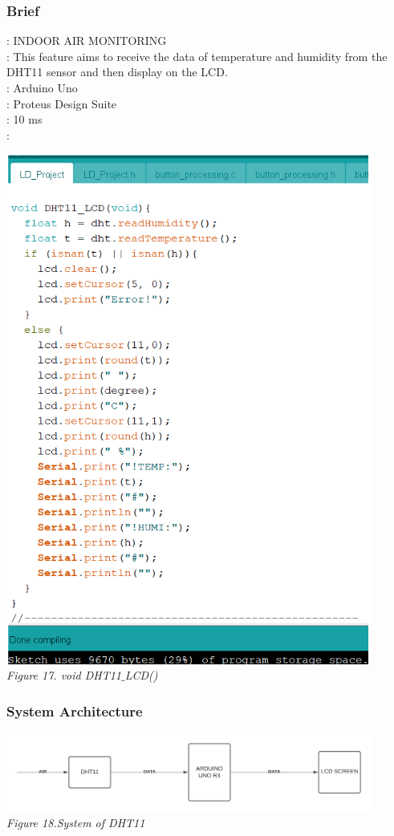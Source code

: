 \documentclass[a4paper]{article}
\begin{document}
\subsubsection{Brief}
\text{[TOPIC]}: INDOOR AIR MONITORING\\
\text{[Description]}: This feature aims to receive the data of temperature and humidity from the DHT11 sensor and then display on the LCD.\\
\text{[Board]}: Arduino Uno\\
\text{[Simulation]}: Proteus Design Suite\\
: 10 ms\\
: 
\medskip
\begin{center}
    \includegraphics[width=12cm]{pictures/DHT.png}\\
    \textit{Figure 17. void DHT11$\_$LCD()}\\
\end{center}
\subsubsection{System Architecture}
\medskip
\begin{center}
    \includegraphics[width=12cm]{pictures/SA_Dht.png}\\
    \textit{Figure 18.System of DHT11}\\
\end{center}
\medskip
\end{document}
